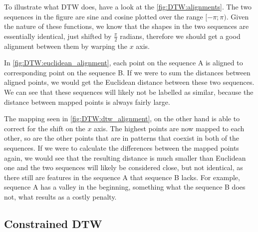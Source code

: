 \documentclass[parskip]{cs4rep}
\begin{document}
To illustrate what DTW does, have a look at the \autoref{fig:DTW:alignments}. The two sequences in the figure are sine and cosine plotted over the range $[-\pi; \pi)$. Given the nature of these functions, we know that the shapes in the two sequences are essentially identical, just shifted by $\frac{\pi}{2}$ radians, therefore we should get a good alignment between them by warping the $x$ axis.

In \autoref{fig:DTW:euclidean_alignment}, each point on the sequence A is aligned to corresponding point on the sequence B. If we were to sum the distances between aligned points, we would get the Euclidean distance between these two sequences. We can see that these sequences will likely not be labelled as similar, because the distance between mapped points is always fairly large. 

The mapping seen in \autoref{fig:DTW:dtw_alignment}, on the other hand is able to correct for the shift on the $x$ axis. The highest points are now mapped to each other, so are the other points that are in patterns that coexist in both of the sequences. If we were to calculate the differences between the mapped points again, we would see that the resulting distance is much smaller than Euclidean one and the two sequences will likely be considered close, but not identical, as there still are features in the sequence A that sequence B lacks. For example, sequence A has a valley in the beginning, something what the sequence B does not, what results as a costly penalty.

\subsection{Constrained DTW}
\end{document}

